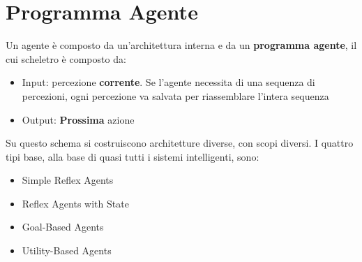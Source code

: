 \documentclass[a4paper, 11pt, oneside]{book}
\theoremstyle{definition}
\begin{document}
	\section{Programma Agente}
	Un agente \`e composto da un'architettura interna e da un \textbf{programma agente},
	il cui scheletro \`e composto da:
	\begin{itemize}
		\item Input: percezione \textbf{corrente}. Se l'agente necessita di una sequenza di
			percezioni, ogni percezione va salvata per riassemblare l'intera sequenza

		\item Output: \textbf{Prossima} azione
	\end{itemize}

	Su questo schema si costruiscono architetture diverse, con scopi diversi. I quattro
	tipi base, alla base di quasi tutti i sistemi intelligenti, sono:
	\begin{itemize}
		\item Simple Reflex Agents

		\item Reflex Agents with State

		\item Goal-Based Agents

		\item Utility-Based Agents
	\end{itemize}
\end{document}
